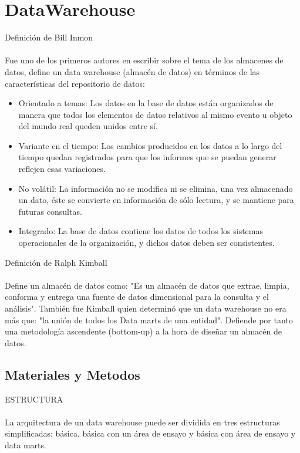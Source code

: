 \documentclass[preprint,12pt]{elsarticle}
\begin{document}
\section{DataWarehouse}

Definición de Bill Inmon\\
\\Fue uno de los primeros autores en escribir sobre el tema de los almacenes de datos, define un data warehouse (almacén de datos) en términos de las características del repositorio de datos:

\begin{itemize}
	\item Orientado a temas: Los datos en la base de datos están organizados de manera que todos los elementos de datos relativos al mismo evento u objeto del mundo real queden unidos entre sí.
	\item Variante en el tiempo: Los cambios producidos en los datos a lo largo del tiempo quedan registrados para que los informes que se puedan generar reflejen esas variaciones.
	\item No volátil: La información no se modifica ni se elimina, una vez almacenado un dato, éste se convierte en información de sólo lectura, y se mantiene para futuras consultas.
	\item Integrado: La base de datos contiene los datos de todos los sistemas operacionales de la organización, y dichos datos deben ser consistentes.
\end{itemize}

Definición de Ralph Kimball\\
\\Define un almacén de datos como: "Es un almacén de datos que extrae, limpia, conforma y entrega una fuente de datos dimensional para la consulta y el análisis". También fue Kimball quien determinó que un data warehouse no era más que: "la unión de todos los Data marts de una entidad". Defiende por tanto una metodología ascendente (bottom-up) a la hora de diseñar un almacén de datos.

\pagebreak

\subsection{Materiales y Metodos}

ESTRUCTURA\\
\\La arquitectura de un data warehouse puede ser dividida en tres estructuras simplificadas: básica, básica con un área de ensayo y básica con área de ensayo y data marts.
\end{document}
